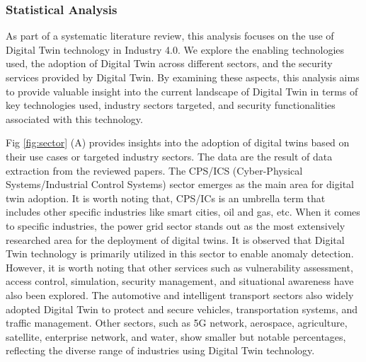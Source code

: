 \subsubsection{Statistical Analysis}




As part of a systematic literature review, this analysis focuses on the use of Digital Twin technology in Industry 4.0. We explore the enabling technologies used, the adoption of Digital Twin across different sectors, and the security services provided by Digital Twin. By examining these aspects, this analysis aims to provide valuable insight into the current landscape of Digital Twin in terms of key technologies used, industry sectors targeted, and security functionalities associated with this technology. 


Fig \ref{fig:sector} (A) provides insights into the adoption of digital twins based on their use cases or targeted industry sectors. The data are the result of data extraction from the reviewed papers. The CPS/ICS (Cyber-Physical Systems/Industrial Control Systems) sector emerges as the main area for digital twin adoption. It is worth noting that, CPS/ICs is an umbrella term that includes other specific industries like smart cities, oil and gas, etc. When it comes to specific industries, the power grid sector stands out as the most extensively researched area for the deployment of digital twins. It is observed that Digital Twin technology is primarily utilized in this sector to enable anomaly detection. However, it is worth noting that other services such as vulnerability assessment, access control, simulation, security management, and situational awareness have also been explored. The automotive and intelligent transport sectors also widely adopted Digital Twin to protect and secure vehicles, transportation systems, and traffic management. Other sectors, such as 5G network, aerospace, agriculture, satellite, enterprise network, and water, show smaller but notable percentages, reflecting the diverse range of industries using Digital Twin technology. 


